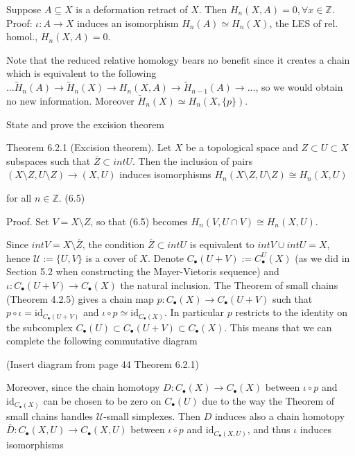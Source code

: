 Suppose \( A \subseteq X\) is a deformation retract of \( X \). Then \( H_n(X, A) = 0, \forall x \in \mathbb{Z}\).
Proof: \( \iota : A \to X\) induces an isomorphism \( H_n(A) \simeq H_n(X) \), the LES of rel. homol., \( H_n(X, A) = 0 \).

Note that the reduced relative homology bears no benefit since it creates a chain which is equivalent to the following
\( \dots \tilde{H}_n(A) \longrightarrow \tilde{H}_n(X) \longrightarrow H_n(X, A) \longrightarrow \tilde{H}_{n-1}(A) \longrightarrow \dots \),
so we would obtain no new information. Moreover \( \tilde{H}_n(X) \simeq H_n(X, \{p\}) \).


State and prove the excision theorem

Theorem 6.2.1 (Excision theorem). Let \(X\) be a topological space and \(Z \subset U \subset X\) subspaces such that \(\overline{Z} \subset int U\). 
Then the inclusion of pairs \((X \setminus Z, U \setminus Z) \to (X, U)\) induces isomorphisms 
\(H_n(X \setminus Z, U \setminus Z) \cong H_n(X, U)\)

for all \(n \in \mathbb{Z}\). \qquad (6.5)

Proof. Set \(V = X \setminus Z\), so that (6.5) becomes
\(H_n(V, U \cap V) \cong H_n(X, U).\)


Since \(int V = X \setminus \overline{Z}\), the condition \(\overline{Z} \subset int U\) is 
equivalent to \(int V \cup int U = X\), hence \(\mathcal{U} := \{U, V\}\) is a cover of \(X\). 
Denote \(C_\bullet(U + V) := C^{U}_\bullet(X)\) 
(as we did in Section 5.2 when constructing the Mayer-Vietoris sequence) 
and \(\iota: C_\bullet(U + V) \to C_\bullet(X)\) the natural inclusion. 
The Theorem of small chains (Theorem 4.2.5) gives a chain map \(p: C_\bullet(X) \to C_\bullet(U + V)\) 
such that \(p \circ \iota = \text{id}_{C_\bullet(U + V)}\) and \(\iota \circ p \simeq \text{id}_{C_\bullet(X)}\). 
In particular \(p\) restricts to the identity on the subcomplex \(C_\bullet(U) \subset C_\bullet(U + V) \subset C_\bullet(X)\). 
This means that we can complete the following commutative diagram 

(Insert diagram from page 44 Theorem 6.2.1)

Moreover, since the chain homotopy \(D: C_\bullet(X) \to C_\bullet(X)\) between \(\iota \circ p\) and \(\text{id}_{C_\bullet(X)}\) 
can be chosen to be zero on \(C_\bullet(U)\) due to the way the Theorem of small chains handles \( \mathcal{U} \)-small simplexes. 
Then \(D\) induces also a chain homotopy 
\(\overline{D}: C_\bullet(X, U) \to C_\bullet(X, U)\) between \(\overline{\iota \circ p}\) and \(\text{id}_{C_\bullet(X, U)}\), 
and thus \(\iota\) induces isomorphisms

